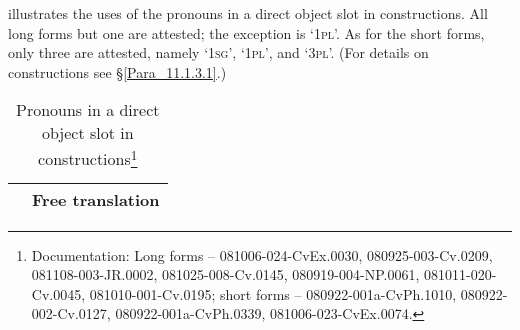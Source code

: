  illustrates the uses of the pronouns in a direct object slot in  constructions. All long forms but one are attested; the exception is  ‘\textsc{1pl}’. As for the short forms, only three are attested, namely  ‘\textsc{1sg}’,  ‘\textsc{1pl}’, and  ‘\textsc{3pl}’. (For details on  constructions see §\ref{Para_11.1.3.1}.)


\begin{table}[p]

\caption[Pronouns in a direct object slot in  constructions]{Pronouns in a direct object slot in  constructions\footnote{Documentation: Long  forms – 081006-024-CvEx.0030, 080925-003-Cv.0209, 081108-003-JR.0002, 081025-008-Cv.0145, 080919-004-NP.0061, 081011-020-Cv.0045, 081010-001-Cv.0195; short  forms – 080922-001a-CvPh.1010, 080922-002-Cv.0127, 080922-001a-CvPh.0339, 081006-023-CvEx.0074.}}\label{Table_6.4}

\begin{tabular}{ll}
\lsptoprule
 \multicolumn{1}{c}{Example} &  \multicolumn{1}{c}{Free translation}\\
\midrule


\end{tabular}
\end{table}
